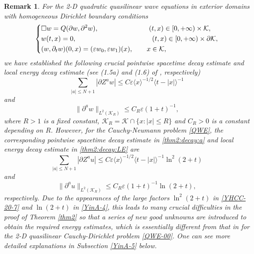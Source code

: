 \documentclass[11pt,twoside]{article}
\def\cK{\mathcal K}
\def\p{\partial}
\def\ve{\varepsilon}
\newcommand{\w}[1]{\langle {#1} \rangle}
\theoremstyle{plain}
\newtheorem{remark}{Remark}[section]
\theoremstyle{definition}
\numberwithin{equation}{section}
\begin{document}
\begin{remark}\label{rmk-decay}
For the 2-D quadratic
quasilinear wave equations
in exterior domains with homogeneous Dirichlet boundary conditions
\begin{equation}\label{QWE-00}
\left\{
\begin{aligned}
&\Box w=Q(\p w,\p^2w),\hspace{2.6cm} (t,x)\in[0,+\infty)\times\cK,\\
&w(t,x)=0,\hspace{3.9cm} (t,x)\in[0,+\infty)\times\p\cK,\\
&(w,\p_tw)(0,x)=(\ve w_0,\ve w_1)(x),\qquad x\in\cK,
\end{aligned}
\right.
\end{equation}
we have established the following crucial pointwise spacetime decay estimate and local energy decay estimate (see (1.5a) and (1.6) of \cite{HouYinYuan24}, respectively)
\begin{equation}\label{YHCC-20-6}
\sum_{|a|\le N+1}|\p Z^aw|\le C\ve\w{x}^{-1/2}\w{t-|x|}^{-1}
\end{equation}
and
\begin{equation}\label{Dirichlet-decay}
\|\p^aw\|_{L^2(\cK_R)}\le C_R\ve(1+t)^{-1},
\end{equation}
where $R>1$ is a fixed constant, $\cK_R=\cK\cap\{x: |x|\le R\}$ and  $C_R>0$ is a constant
depending on $R$. However, for the Cauchy-Neumann problem \eqref{QWE}, the corresponding pointwise spacetime decay
estimate in \eqref{thm2:decay:a}
and local energy decay estimate in \eqref{thm2:decay:LE} are
\begin{equation}\label{YHCC-20-7}
\sum_{|a|\le N+1}|\p Z^au|\le C\ve\w{x}^{-1/2}\w{t-|x|}^{-1}\ln^2(2+t)
\end{equation}
and
\begin{equation}\label{YinA-4}
\|\p^au\|_{L^2(\cK_R)}\le C_R\ve(1+t)^{-1}\ln(2+t),
\end{equation}
respectively. Due to the appearances of the large factors $\ln^2(2+t)$ in \eqref{YHCC-20-7}
and $\ln(2+t)$ in \eqref{YinA-4},
this leads to many crucial difficulties in the proof of Theorem \ref{thm2} so that a series of new good unknowns are
introduced to obtain the required energy estimates, which is essentially different from
that in \cite{HouYinYuan24} for the 2-D quasilinear Cauchy-Dirichlet problem \eqref{QWE-00}. One can see
more detailed explanations in Subsection \ref{YinA-5} below.


\end{remark}
\end{document}
